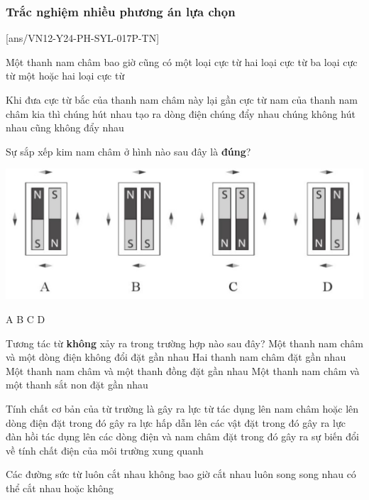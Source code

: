 \subsubsection{Trắc nghiệm nhiều phương án lựa chọn}
\setcounter{ex}{0}
[ans/VN12-Y24-PH-SYL-017P-TN]
\begin{ex}
	Một thanh nam châm bao giờ cũng có
	\choice
	{một loại cực từ}
	{\True hai loại cực từ}
	{ba loại cực từ}
	{một hoặc hai loại cực từ}
	\loigiai{}
\end{ex}
\begin{ex}
	Khi đưa cực từ bắc của thanh nam châm này lại gần cực từ nam của thanh nam châm kia thì
	\choice
	{\True chúng hút nhau}
	{tạo ra dòng điện}
	{chúng đẩy nhau}
	{chúng không hút nhau cũng không đẩy nhau}
	\loigiai{}
\end{ex}
\begin{ex}
	Sự sắp xếp kim nam châm ở hình nào sau đây là \textbf{đúng}?	
	\begin{center}
		\includegraphics[width=0.7\linewidth]{figs/VN12-Y24-PH-SYL-017P-7}
	\end{center}
	\choice
	{\True A}
	{B}
	{C}
	{D}
	\loigiai{}
\end{ex}

\begin{ex}
	Tương tác từ \textbf{không} xảy ra trong trường hợp nào sau đây?
	\choice
	{Một thanh nam châm và một dòng điện không đổi đặt gần nhau}
	{Hai thanh nam châm đặt gần nhau}
	{\True Một thanh nam châm và một thanh đồng đặt gần nhau}
	{Một thanh nam châm và một thanh sắt non đặt gần nhau}
	\loigiai{}
\end{ex}
\begin{ex}
	Tính chất cơ bản của từ trường là
	\choice
	{\True gây ra lực từ tác dụng lên nam châm hoặc lên dòng điện đặt trong đó}
	{gây ra lực hấp dẫn lên các vật đặt trong đó}
	{gây ra lực đàn hồi tác dụng lên các dòng điện và nam châm đặt trong đó}
	{gây ra sự biến đổi về tính chất điện của môi trường xung quanh}
	\loigiai{}
\end{ex}
\begin{ex}
	Các đường sức từ	
	\choice
	{luôn cắt nhau}
	{\True không bao giờ cắt nhau}
	{luôn song song nhau}
	{có thể cắt nhau hoặc không}
	\loigiai{}
\end{ex}

